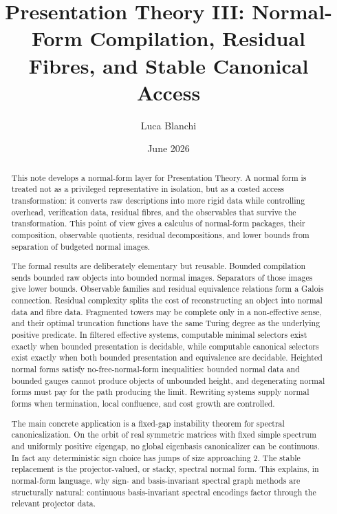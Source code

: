 \documentclass[11pt]{article}
\title{Presentation Theory III: Normal-Form Compilation, Residual Fibres, and Stable Canonical Access}
\author{Luca Blanchi}
\date{June 2026}
\begin{document}
\maketitle

\begin{abstract}
This note develops a normal-form layer for Presentation Theory. A normal form is treated not as a privileged representative in isolation, but as a costed access transformation: it converts raw descriptions into more rigid data while controlling overhead, verification data, residual fibres, and the observables that survive the transformation. This point of view gives a calculus of normal-form packages, their composition, observable quotients, residual decompositions, and lower bounds from separation of budgeted normal images.

The formal results are deliberately elementary but reusable. Bounded compilation sends bounded raw objects into bounded normal images. Separators of those images give lower bounds. Observable families and residual equivalence relations form a Galois connection. Residual complexity splits the cost of reconstructing an object into normal data and fibre data. Fragmented towers may be complete only in a non-effective sense, and their optimal truncation functions have the same Turing degree as the underlying positive predicate. In filtered effective systems, computable minimal selectors exist exactly when bounded presentation is decidable, while computable canonical selectors exist exactly when both bounded presentation and equivalence are decidable. Heighted normal forms satisfy no-free-normal-form inequalities: bounded normal data and bounded gauges cannot produce objects of unbounded height, and degenerating normal forms must pay for the path producing the limit. Rewriting systems supply normal forms when termination, local confluence, and cost growth are controlled.

The main concrete application is a fixed-gap instability theorem for spectral canonicalization. On the orbit of real symmetric matrices with fixed simple spectrum and uniformly positive eigengap, no global eigenbasis canonicalizer can be continuous. In fact any deterministic sign choice has jumps of size approaching \(2\). The stable replacement is the projector-valued, or stacky, spectral normal form. This explains, in normal-form language, why sign- and basis-invariant spectral graph methods are structurally natural: continuous basis-invariant spectral encodings factor through the relevant projector data.
\end{abstract}
\end{document}
